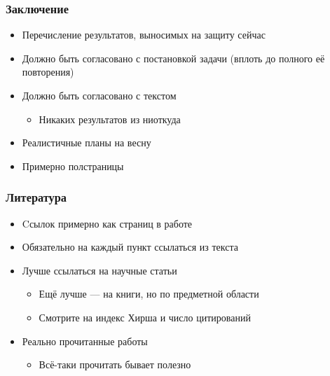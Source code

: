 \documentclass[xetex,mathserif,serif]{beamer}
\begin{document}
    \begin{frame}
        \frametitle{Заключение}
        \begin{itemize}
            \item Перечисление результатов, выносимых на защиту сейчас
            \item Должно быть согласовано с постановкой задачи (вплоть до полного её повторения)
            \item Должно быть согласовано с текстом
            \begin{itemize}
                \item Никаких результатов из ниоткуда
            \end{itemize}
            \item Реалистичные планы на весну
            \item Примерно полстраницы
        \end{itemize}
    \end{frame}

    \begin{frame}
        \frametitle{Литература}
        \begin{itemize}
            \item Cсылок примерно как страниц в работе
            \item Обязательно на каждый пункт ссылаться из текста
            \item Лучше ссылаться на научные статьи
            \begin{itemize}
                \item Ещё лучше --- на книги, но по предметной области
                \item Смотрите на индекс Хирша и число цитирований
            \end{itemize}
            \item Реально прочитанные работы
            \begin{itemize}
                \item Всё-таки прочитать бывает полезно
            \end{itemize}
        \end{itemize}
    \end{frame}
\end{document}
